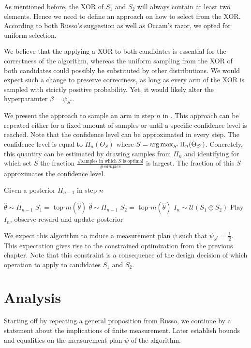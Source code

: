 As mentioned before, the XOR of $S_1$ and $S_2$ will always contain at least two
elements. Hence we need to define an approach on how to select from the XOR.
According to both Russo's suggestion as well as Occam's razor, we opted for
uniform selection.

We believe that the applying a XOR to both candidates is essential for the
correctness of the algorithm, whereas the uniform sampling from the XOR of both
candidates could possibly be substituted by other distributions. We would expect
such a change to preserve correctness, as long as every arm of the XOR is
sampled with strictly positive probability. Yet, it would likely alter the
hyperparamter $\beta = \psi_{S^*}$.

We present the approach to sample an arm in step $n$ in .
This approach can be repeated either for a fixed amount of samples or until a
specific confidence level is reached. Note that the confidence level can be
approximated in every step. The confidence level is equal to $\Pi_n(\Theta_S)$
where $S = \operatorname*{arg\,max}_{S'} \Pi_n(\Theta_{S'})$. Concretely, this quantity can be
estimated by drawing samples from $\Pi_n$ and identifying for which set $S$ the
fraction $\frac{\text{\# samples in which $S$ is optimal}}{\#samples}$ is
largest. The fraction of this $S$ approximates the confidence level.
\begin{algorithm}[H]
  \caption{Given a posterior $\Pi_{n-1}$ in step $n$}
  \label{alg:TXTS}
  \begin{algorithmic}
    \State $\hat{\theta} \sim \Pi_{n-1}$
    \State $S_1 =$ top-$m(\hat{\theta})$
    \Repeat
      \State $\hat{\theta} \sim \Pi_{n-1}$
      \State $S_2 = $ top-$m(\hat{\theta})$
    \State $I_n \sim \mathcal{U}(S_1 \oplus S_2)$
    \State Play $I_n$, observe reward and update posterior
  \end{algorithmic}
\end{algorithm}
We expect this algorithm to induce a measurement plan $\psi$ such that
$\psi_{S^*} = \frac{1}{2}$. This expectation gives rise to the constrained
optimization from the previous chapter. Note that this constraint is a
consequence of the design decision of which operation to apply to candidates
$S_1$ and $S_2$.

\section{Analysis}\label{section:analysis}
Starting off by repeating a general proposition from Russo, we continue by a statement about the implications of finite measurement. Later establish bounds and equalities on the measurement plan $\psi$ of the
algorithm.

